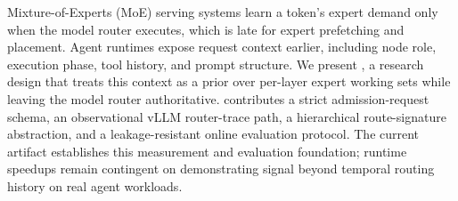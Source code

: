 Mixture-of-Experts (MoE) serving systems learn a token's expert demand only
when the model router executes, which is late for expert prefetching and
placement. Agent runtimes expose request context earlier, including node role,
execution phase, tool history, and prompt structure. We present \project, a
research design that treats this context as a prior over per-layer expert
working sets while leaving the model router authoritative. \project contributes
a strict admission-request schema, an observational vLLM router-trace path, a
hierarchical route-signature abstraction, and a leakage-resistant online
evaluation protocol. The current artifact establishes this measurement and
evaluation foundation; runtime speedups remain contingent on demonstrating
signal beyond temporal routing history on real agent workloads.
